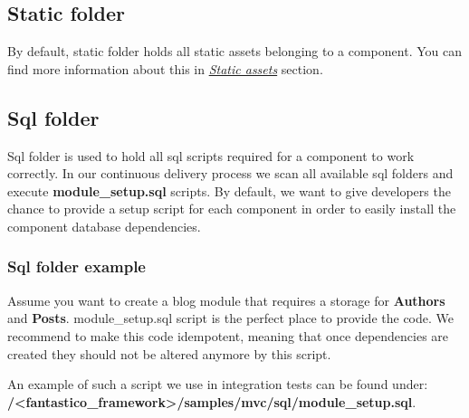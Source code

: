 \documentclass[letterpaper,10pt,english]{sphinxmanual}
\begin{document}
\subsection{Static folder}
\label{features/component_model:static-folder}
By default, static folder holds all static assets belonging to a component. You can find more information about this
in {\hyperref[how_to/static_assets::doc]{\emph{Static assets}}} section.


\subsection{Sql folder}
\label{features/component_model:sql-folder}
Sql folder is used to hold all sql scripts required for a component to work correctly. In our continuous delivery
process we scan all available sql folders and execute \textbf{module\_setup.sql} scripts. By default, we want to give
developers the chance to provide a setup script for each component in order to easily install the component database
dependencies.


\subsubsection{Sql folder example}
\label{features/component_model:sql-folder-example}
Assume you want to create a blog module that requires a storage for \textbf{Authors} and \textbf{Posts}. module\_setup.sql script
is the perfect place to provide the code. We recommend to make this code idempotent, meaning that once dependencies are
created they should not be altered anymore by this script.

An example of such a script we use in integration tests can be found under: \textbf{/\textless{}fantastico\_framework\textgreater{}/samples/mvc/sql/module\_setup.sql}.
\end{document}
